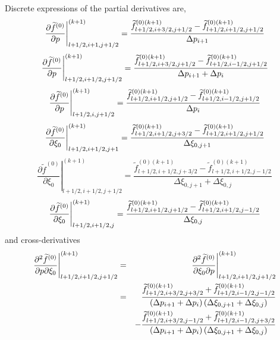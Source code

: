 Discrete expressions of the partial derivatives are,
\begin{equation}
\left. \frac{\partial \widetilde{f}^{\left( 0\right) }}{\partial p}\right|
_{l+1/2,i+1,j+1/2}^{(k+1)}=\frac{\widetilde{f}_{l+1/2,i+3/2,j+1/2}^{\left(
0\right) (k+1)}-\widetilde{f}_{l+1/2,i+1/2,j+1/2}^{\left( 0\right) (k+1)}}{%
\Delta p_{i+1}}
\end{equation}
\begin{equation}
\left. \frac{\partial \widetilde{f}^{\left( 0\right) }}{\partial p}\right|
_{l+1/2,i+1/2,j+1/2}^{(k+1)}=\frac{\widetilde{f}_{l+1/2,i+3/2,j+1/2}^{\left(
0\right) (k+1)}-\widetilde{f}_{l+1/2,i-1/2,j+1/2}^{\left( 0\right) (k+1)}}{%
\Delta p_{i+1}+\Delta p_{i}}
\end{equation}
\begin{equation}
\left. \frac{\partial \widetilde{f}^{\left( 0\right) }}{\partial p}\right|
_{l+1/2,i,j+1/2}^{(k+1)}=\frac{\widetilde{f}_{l+1/2,i+1/2,j+1/2}^{\left(
0\right) (k+1)}-\widetilde{f}_{l+1/2,i-1/2,j+1/2}^{\left( 0\right) (k+1)}}{%
\Delta p_{i}}
\end{equation}
\begin{equation}
\left. \frac{\partial \widetilde{f}^{\left( 0\right) }}{\partial \xi _{0}}
\right| _{l+1/2,i+1/2,j+1}^{(k+1)}=\frac{\widetilde{f}_{l+1/2,i+1/2,j+3/2}^{%
\left( 0\right) (k+1)}-\widetilde{f}_{l+1/2,i+1/2,j+1/2}^{\left( 0\right)
(k+1)}}{\Delta \xi _{0,j+1}}
\end{equation}
\begin{equation}
\left. \frac{\partial \widetilde{f}^{\left( 0\right) }}{\partial \xi _{0}}%
\right| _{l+1/2,i+1/2,j+1/2}^{(k+1)}=\frac{\widetilde{f}%
_{l+1/2,i+1/2,j+3/2}^{\left( 0\right) (k+1)}-\widetilde{f}
_{l+1/2,i+1/2,j-1/2}^{\left( 0\right) (k+1)}}{\Delta \xi _{0,j+1}+\Delta \xi
_{0,j}}
\end{equation}
\begin{equation}
\left. \frac{\partial \widetilde{f}^{\left( 0\right) }}{\partial \xi _{0}}
\right| _{l+1/2,i+1/2,j}^{(k+1)}=\frac{\widetilde{f}_{l+1/2,i+1/2,j+1/2}^{%
\left( 0\right) (k+1)}-\widetilde{f}_{l+1/2,i+1/2,j-1/2}^{\left( 0\right)
(k+1)}}{\Delta \xi _{0,j}}
\end{equation}
and cross-derivatives
\begin{eqnarray}
\left. \frac{\partial ^{2}\widetilde{f}^{\left( 0\right) }}{\partial
p\partial \xi _{0}}\right| _{l+1/2,i+1/2,j+1/2}^{(k+1)} &=&\left. \frac{%
\partial ^{2}\widetilde{f}^{\left( 0\right) }}{\partial \xi _{0}\partial p}
\right| _{l+1/2,i+1/2,j+1/2}^{(k+1)}  \nonumber \\
&=&\frac{\widetilde{f}_{l+1/2,i+3/2,j+3/2}^{\left( 0\right) (k+1)}+%
\widetilde{f}_{l+1/2,i-1/2,j-1/2}^{\left( 0\right) (k+1)}}{\left( \Delta
p_{i+1}+\Delta p_{i}\right) \left( \Delta \xi _{0,j+1}+\Delta \xi
_{0,j}\right) }  \nonumber \\
&&-\frac{\widetilde{f}_{l+1/2,i+3/2,j-1/2}^{\left( 0\right) (k+1)}+%
\widetilde{f}_{l+1/2,i-1/2,j+3/2}^{\left( 0\right) (k+1)}}{\left( \Delta
p_{i+1}+\Delta p_{i}\right) \left( \Delta \xi _{0,j+1}+\Delta \xi
_{0,j}\right) }
\end{eqnarray}


